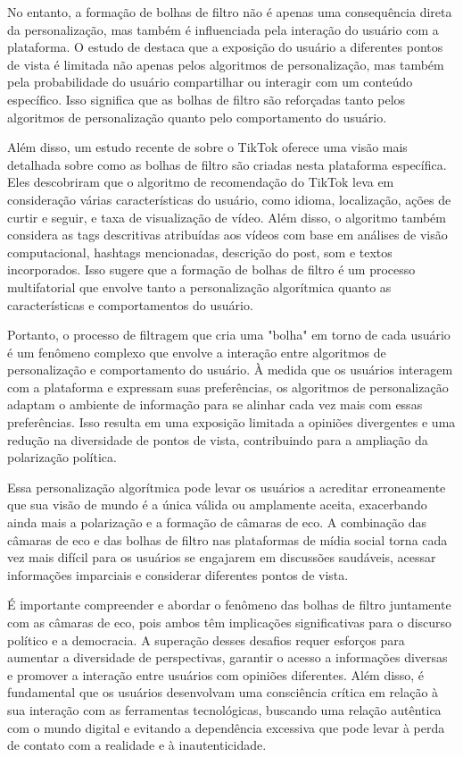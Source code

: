 No entanto, a formação de bolhas de filtro não é apenas uma consequência direta da personalização, mas também é influenciada pela interação do usuário com a plataforma. O estudo de  destaca que a exposição do usuário a diferentes pontos de vista é limitada não apenas pelos algoritmos de personalização, mas também pela probabilidade do usuário compartilhar ou interagir com um conteúdo específico. Isso significa que as bolhas de filtro são reforçadas tanto pelos algoritmos de personalização quanto pelo comportamento do usuário.

Além disso, um estudo recente de  sobre o TikTok oferece uma visão mais detalhada sobre como as bolhas de filtro são criadas nesta plataforma específica. Eles descobriram que o algoritmo de recomendação do TikTok leva em consideração várias características do usuário, como idioma, localização, ações de curtir e seguir, e taxa de visualização de vídeo. Além disso, o algoritmo também considera as tags descritivas atribuídas aos vídeos com base em análises de visão computacional, hashtags mencionadas, descrição do post, som e textos incorporados. Isso sugere que a formação de bolhas de filtro é um processo multifatorial que envolve tanto a personalização algorítmica quanto as características e comportamentos do usuário.

Portanto, o processo de filtragem que cria uma "bolha" em torno de cada usuário é um fenômeno complexo que envolve a interação entre algoritmos de personalização e comportamento do usuário. À medida que os usuários interagem com a plataforma e expressam suas preferências, os algoritmos de personalização adaptam o ambiente de informação para se alinhar cada vez mais com essas preferências. Isso resulta em uma exposição limitada a opiniões divergentes e uma redução na diversidade de pontos de vista, contribuindo para a ampliação da polarização política.

Essa personalização algorítmica pode levar os usuários a acreditar erroneamente que sua visão de mundo é a única válida ou amplamente aceita, exacerbando ainda mais a polarização e a formação de câmaras de eco. A combinação das câmaras de eco e das bolhas de filtro nas plataformas de mídia social torna cada vez mais difícil para os usuários se engajarem em discussões saudáveis, acessar informações imparciais e considerar diferentes pontos de vista.

É importante compreender e abordar o fenômeno das bolhas de filtro juntamente com as câmaras de eco, pois ambos têm implicações significativas para o discurso político e a democracia. A superação desses desafios requer esforços para aumentar a diversidade de perspectivas, garantir o acesso a informações diversas e promover a interação entre usuários com opiniões diferentes. Além disso, é fundamental que os usuários desenvolvam uma consciência crítica em relação à sua interação com as ferramentas tecnológicas, buscando uma relação autêntica com o mundo digital e evitando a dependência excessiva que pode levar à perda de contato com a realidade e à inautenticidade.

